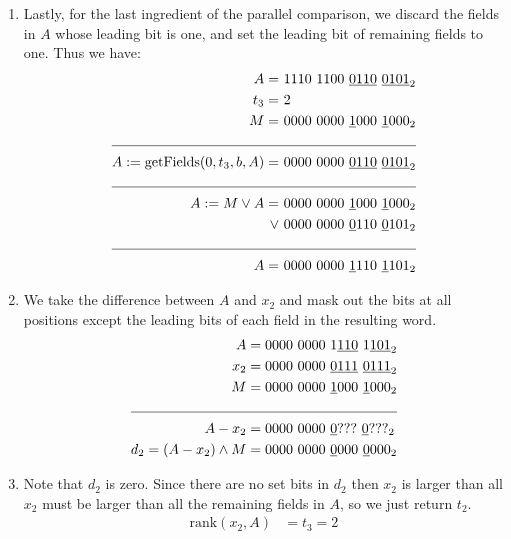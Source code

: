 \begin{itemize}
\begin{enumerate}
        \item
        Lastly, for the last ingredient of the parallel comparison, we discard the fields in $A$ whose leading bit is one, and set the leading bit of remaining fields to one. Thus we have:
        \begin{align*}
            A = &\ 1110\ 1100\ \underline{0110}\ \underline{0101}_2 \\
            t_3 = &\ 2 \\ 
            M = &\ 0000\ 0000\ \underline{1}000\ \underline{1}000_2 \\
            \cline{1-2}
            A := \text{getFields}(0, t_3, b, A) = &\ 0000\ 0000\ \underline{0110}\ \underline{0101}_2 \\
            \cline{1-2}
            A := M \vee A = &\ 0000\ 0000\ \underline{1}000\ \underline{1}000_2 \\
            \vee &\ 0000\ 0000\ \underline{0}110\ \underline{0}101_2 \\
            \cline{1-2}
            A = &\ 0000\ 0000\ \underline{1}110\ \underline{1}101_2
        \end{align*}
        
        \item
        We take the difference between $A$ and $x_2$ and mask out the bits at all positions except the leading bits of each field in the resulting word.
        \begin{align*}
            A &= 0000\ 0000\ 1\underline{110}\ 1\underline{101}_2 \\
            x_2 &= 0000\ 0000\ \underline{0111}\ \underline{0111}_2 \\
            M &= 0000\ 0000\ \underline{1}000\ \underline{1}000_2 \\
            \cline{1-2}
            A - x_2 &= 0000\ 0000\ \underline{0}???\ \underline{0}???_2 \\
            d_2 = (A - x_2) \wedge M &= 0000\ 0000\ \underline{0}000\ \underline{0}000_2 \\
        \end{align*}
        
        \item
        Note that $d_2$ is zero. Since there are no set bits in $d_2$ then $x_2$ is larger than all $x_2$ must be larger than all the remaining fields in $A$, so we just return $t_2$.
        \begin{align*}
            \text{rank}(x_2,A) &= t_3 = 2
        \end{align*}
        
    \end{enumerate}
\end{itemize}

